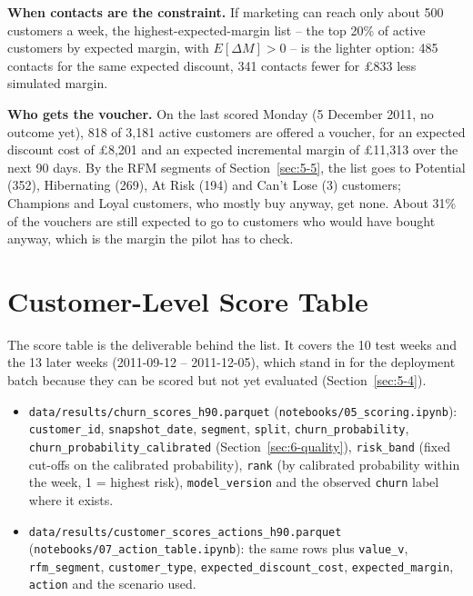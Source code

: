 \textbf{When contacts are the constraint.} If marketing can reach only about 500 customers a week, the highest-expected-margin list -- the top 20\% of active customers by expected margin, with $E[\Delta M] > 0$ -- is the lighter option: 485 contacts for the same expected discount, 341 contacts fewer for \pounds833 less simulated margin.

\textbf{Who gets the voucher.} On the last scored Monday (5 December 2011, no outcome yet), 818 of 3,181 active customers are offered a voucher, for an expected discount cost of \pounds8,201 and an expected incremental margin of \pounds11,313 over the next 90 days. By the RFM segments of Section~\ref{sec:5-5}, the list goes to Potential (352), Hibernating (269), At Risk (194) and Can't Lose (3) customers; Champions and Loyal customers, who mostly buy anyway, get none. About 31\% of the vouchers are still expected to go to customers who would have bought anyway, which is the margin the pilot has to check.

\section{Customer-Level Score Table}
\label{sec:8-4}

The score table is the deliverable behind the list. It covers the 10 test weeks and the 13 later weeks (2011-09-12 -- 2011-12-05), which stand in for the deployment batch because they can be scored but not yet evaluated (Section~\ref{sec:5-4}).

{\raggedright
\begin{itemize}
    \item \texttt{data/results/churn\_scores\_h90.parquet} (\texttt{notebooks/05\_scoring.ipynb}): \texttt{customer\_id}, \texttt{snapshot\_date}, \texttt{segment}, \texttt{split}, \texttt{churn\_probability}, \texttt{churn\_probability\_calibrated} (Section~\ref{sec:6-quality}), \texttt{risk\_band} (fixed cut-offs on the calibrated probability), \texttt{rank} (by calibrated probability within the week, 1 = highest risk), \texttt{model\_version} and the observed \texttt{churn} label where it exists.
    \item \texttt{data/results/customer\_scores\_actions\_h90.parquet} (\texttt{notebooks/07\_action\_table.ipynb}): the same rows plus \texttt{value\_v}, \texttt{rfm\_segment}, \texttt{customer\_type}, \texttt{expected\_discount\_cost}, \texttt{expected\_margin}, \texttt{action} and the scenario used.
\end{itemize}
}

